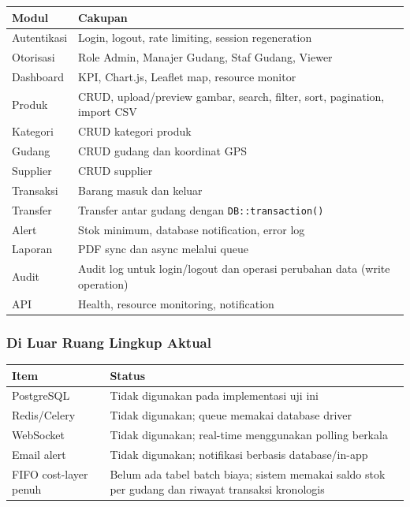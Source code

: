 \documentclass[
]{article}
\begin{document}
\begin{longtable}[]{@{}p{}p{}@{}}
\toprule\noalign{}
Modul & Cakupan \\
\midrule\noalign{}
\endhead
\bottomrule\noalign{}
\endlastfoot
Autentikasi & Login, logout, rate limiting, session regeneration \\
Otorisasi & Role Admin, Manajer Gudang, Staf Gudang, Viewer \\
Dashboard & KPI, Chart.js, Leaflet map, resource monitor \\
Produk & CRUD, upload/preview gambar, search, filter, sort, pagination,
import CSV \\
Kategori & CRUD kategori produk \\
Gudang & CRUD gudang dan koordinat GPS \\
Supplier & CRUD supplier \\
Transaksi & Barang masuk dan keluar \\
Transfer & Transfer antar gudang dengan \texttt{DB::transaction()} \\
Alert & Stok minimum, database notification, error log \\
Laporan & PDF sync dan async melalui queue \\
Audit & Audit log untuk login/logout dan operasi perubahan data (write
operation) \\
API & Health, resource monitoring, notification \\
\end{longtable}

\subsubsection{Di Luar Ruang Lingkup
Aktual}\label{di-luar-ruang-lingkup-aktual}

\begin{longtable}[]{@{}p{}p{}@{}}
\toprule\noalign{}
Item & Status \\
\midrule\noalign{}
\endhead
\bottomrule\noalign{}
\endlastfoot
PostgreSQL & Tidak digunakan pada implementasi uji ini \\
Redis/Celery & Tidak digunakan; queue memakai database driver \\
WebSocket & Tidak digunakan; real-time menggunakan polling berkala \\
Email alert & Tidak digunakan; notifikasi berbasis database/in-app \\
FIFO cost-layer penuh & Belum ada tabel batch biaya; sistem memakai
saldo stok per gudang dan riwayat transaksi kronologis \\
\end{longtable}
\end{document}

